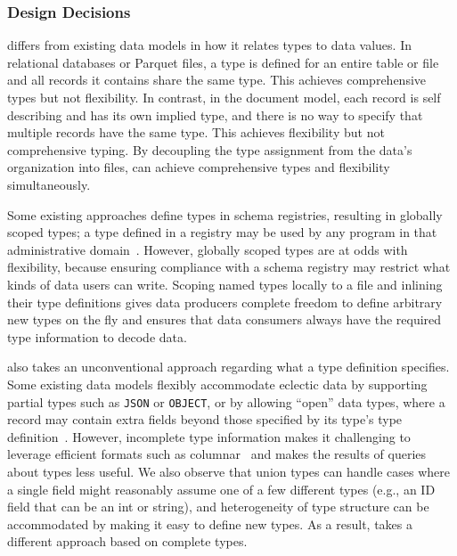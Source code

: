 \subsubsection{Design Decisions} 

\sys{} differs from existing data models in how it relates types to data values. In relational databases or Parquet files, a type is defined for an entire table or file and all records it contains share the same type. This achieves comprehensive types but not flexibility. In contrast, in the document model, each record is self describing and has its own implied type, and there is no way to specify that multiple records have the same type. This achieves flexibility but not comprehensive typing. By decoupling the type assignment from the data's organization into files, \sys{} can achieve comprehensive types and flexibility simultaneously.

Some existing approaches define types in schema registries, resulting in globally scoped types; a type defined in a registry may be used by any program in that administrative domain~\cite{confluent_schema_registry}. However, globally scoped types are at odds with  flexibility, because ensuring compliance with a schema registry may restrict what kinds of data users can write. Scoping named types locally to a file and inlining their type definitions gives data producers complete freedom to define arbitrary new types on the fly and ensures that data consumers always have the required type information to decode data.

\sys{} also takes an unconventional approach regarding what a type definition specifies. Some existing data models flexibly accommodate eclectic data by supporting partial types such as \texttt{JSON} or \texttt{OBJECT}, or by allowing ``open'' data types, where a record may contain extra fields beyond those specified by its type's type definition~\cite{asterixdb, json_schema, xml_schema}. However, incomplete type information makes it challenging to leverage efficient formats such as columnar~\cite{snowflake} and makes the results of queries about types less useful. We also observe that union types can handle cases where a single field might reasonably assume one of a few different types (e.g., an ID field that can be an int or string), and heterogeneity of type structure can be accommodated by making it easy to define new types. As a result, \sys{} takes a different approach based on complete types.

